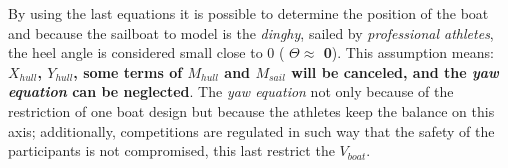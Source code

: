 
By using the last equations it is possible to determine the position of the boat and because the sailboat to model is the \textit{dinghy}, sailed by \textit{professional athletes}, the heel angle is considered small close to 0 ( \textbf{$\Theta \approx$ 0}). This assumption means: \textbf{$X_{hull}$, $Y_{hull}$, some terms of $M_{hull}$ and $M_{sail}$ will be canceled, and the \textit{yaw equation} can be neglected}. The \textit{yaw equation} not only because of the restriction of one boat design but because the athletes keep the balance on this axis; additionally, competitions are regulated in such way that the safety of the participants is not compromised, this last restrict the $V_{boat}$. \par 

